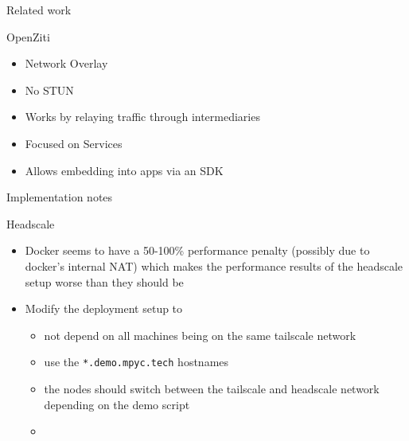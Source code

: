 \begin{frame}[fragile]{Related work}
\begin{block}{OpenZiti}
\protect\hypertarget{openziti}{}
\begin{itemize}
\tightlist
\item
  Network Overlay
\item
  No STUN
\item
  Works by relaying traffic through intermediaries
\item
  Focused on Services
\item
  Allows embedding into apps via an SDK
\end{itemize}
\end{block}
\end{frame}

\begin{frame}[fragile]{Implementation notes}
\protect\hypertarget{implementation-notes}{}
\begin{block}{Headscale}
\protect\hypertarget{headscale}{}
\begin{itemize}
\tightlist
\item
  Docker seems to have a 50-100\% performance penalty (possibly due to
  docker's internal NAT) which makes the performance results of the
  headscale setup worse than they should be
\item
  Modify the deployment setup to

  \begin{itemize}
  \tightlist
  \item
    not depend on all machines being on the same tailscale network
  \item
    use the \texttt{*.demo.mpyc.tech} hostnames
  \item
    the nodes should switch between the tailscale and headscale network
    depending on the demo script
  \item
  \end{itemize}
\end{itemize}
\end{block}
\end{frame}

